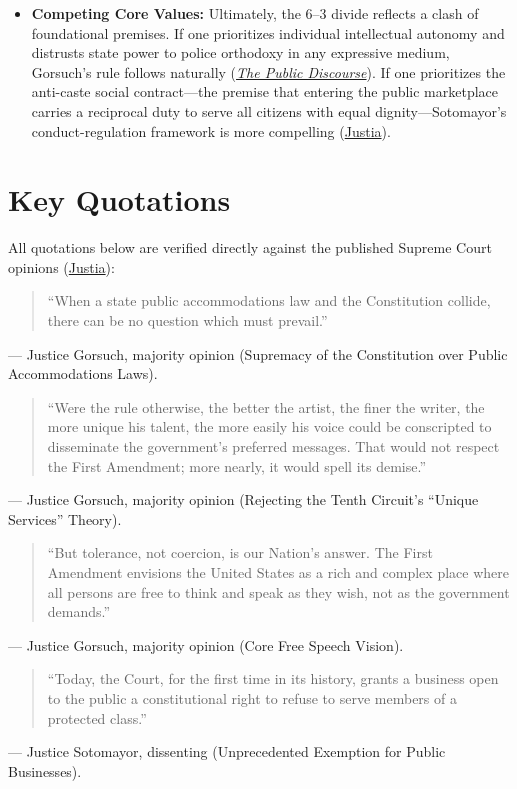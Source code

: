 \documentclass[12pt]{article}
\begin{document}
\begin{itemize}
  \item \textbf{Competing Core Values:} Ultimately, the 6--3 divide reflects a clash of foundational premises. If one prioritizes individual intellectual autonomy and distrusts state power to police orthodoxy in any expressive medium, Gorsuch's rule follows naturally (\href{https://www.thepublicdiscourse.com/2023/07/89894/}{\textit{The Public Discourse}}). If one prioritizes the anti-caste social contract---the premise that entering the public marketplace carries a reciprocal duty to serve all citizens with equal dignity---Sotomayor's conduct-regulation framework is more compelling (\href{https://supreme.justia.com/cases/federal/us/600/21-476/}{Justia}).
\end{itemize}

\section{Key Quotations}
All quotations below are verified directly against the published Supreme Court opinions (\href{https://supreme.justia.com/cases/federal/us/600/21-476/}{Justia}):

\begin{quote}
``When a state public accommodations law and the Constitution collide, there can be no question which must prevail.''
\end{quote}
\noindent --- Justice Gorsuch, majority opinion (Supremacy of the Constitution over Public Accommodations Laws).

\begin{quote}
``Were the rule otherwise, the better the artist, the finer the writer, the more unique his talent, the more easily his voice could be conscripted to disseminate the government's preferred messages. That would not respect the First Amendment; more nearly, it would spell its demise.''
\end{quote}
\noindent --- Justice Gorsuch, majority opinion (Rejecting the Tenth Circuit's ``Unique Services'' Theory).

\begin{quote}
``But tolerance, not coercion, is our Nation's answer. The First Amendment envisions the United States as a rich and complex place where all persons are free to think and speak as they wish, not as the government demands.''
\end{quote}
\noindent --- Justice Gorsuch, majority opinion (Core Free Speech Vision).

\begin{quote}
``Today, the Court, for the first time in its history, grants a business open to the public a constitutional right to refuse to serve members of a protected class.''
\end{quote}
\noindent --- Justice Sotomayor, dissenting (Unprecedented Exemption for Public Businesses).
\end{document}
